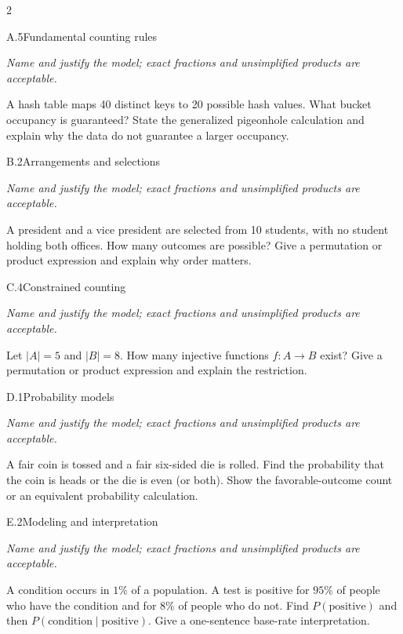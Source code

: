 \documentclass[9pt]{extarticle}
\begin{document}
\CoreWorkArea
\FormBreak
{}
\begin{multicols}{2}
\begin{CoreProblem}{A.5}{Fundamental counting rules}
{\scriptsize\textit{Name and justify the model; exact fractions and unsimplified products are acceptable.}\par}
A hash table maps 40 distinct keys to 20 possible hash values. What
    bucket occupancy is guaranteed? State the generalized pigeonhole calculation
    and explain why the data do not guarantee a larger occupancy.
\end{CoreProblem}
\begin{CoreProblem}{B.2}{Arrangements and selections}
{\scriptsize\textit{Name and justify the model; exact fractions and unsimplified products are acceptable.}\par}
A president and a vice president are selected from 10 students, with
    no student holding both offices. How many outcomes are possible? Give a
    permutation or product expression and explain why order matters.
\end{CoreProblem}
\begin{CoreProblem}{C.4}{Constrained counting}
{\scriptsize\textit{Name and justify the model; exact fractions and unsimplified products are acceptable.}\par}
Let $|A|=5$ and $|B|=8$. How many injective functions $f:A\to B$
    exist? Give a permutation or product expression and explain the restriction.
\end{CoreProblem}
\columnbreak
\begin{CoreProblem}{D.1}{Probability models}
{\scriptsize\textit{Name and justify the model; exact fractions and unsimplified products are acceptable.}\par}
A fair coin is tossed and a fair six-sided die is rolled. Find the
    probability that the coin is heads or the die is even (or both). Show the
    favorable-outcome count or an equivalent probability calculation.
\end{CoreProblem}
\begin{CoreProblem}{E.2}{Modeling and interpretation}
{\scriptsize\textit{Name and justify the model; exact fractions and unsimplified products are acceptable.}\par}
A condition occurs in $1\%$ of a population. A test is positive for
    $95\%$ of people who have the condition and for $8\%$ of people who do not.
    Find $P(\text{positive})$ and then
    $P(\text{condition}\mid\text{positive})$. Give a one-sentence base-rate
    interpretation.
\end{CoreProblem}
\end{multicols}
\end{document}
